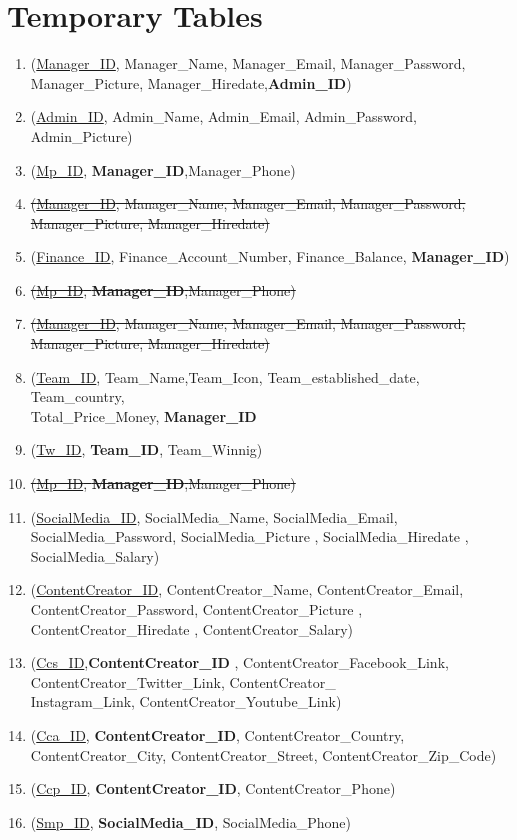 \section{Temporary Tables}
\hrulefill
\begin{enumerate}
    \item  (\underline{Manager\_ID}, Manager\_Name, Manager\_Email, Manager\_Password, Manager\_Picture, Manager\_Hiredate,\textbf{Admin\_ID})
    \item  (\underline{Admin\_ID}, Admin\_Name, Admin\_Email, Admin\_Password, Admin\_Picture)
    \item (\underline{Mp\_ID}, \textbf{Manager\_ID},{Manager\_Phone})


    \item \sout{(\underline{Manager\_ID}, Manager\_Name, Manager\_Email, Manager\_Password, Manager\_Picture, Manager\_Hiredate)}
    \item (\underline{Finance\_ID}, Finance\_Account\_Number, Finance\_Balance,\textbf{ Manager\_ID})
    \item \sout{(\underline{Mp\_ID}, \textbf{Manager\_ID},{Manager\_Phone})}


    \item \sout{(\underline{Manager\_ID}, Manager\_Name, Manager\_Email, Manager\_Password,\\Manager\_Picture, Manager\_Hiredate)}
    \item (\underline{Team\_ID}, Team\_Name,Team\_Icon, Team\_established\_date, Team\_country,\\Total\_Price\_Money, \textbf{Manager\_ID}
    \item (\underline{Tw\_ID}, \textbf{Team\_ID}, Team\_Winnig)
    \item \sout{(\underline{Mp\_ID}, \textbf{Manager\_ID},{Manager\_Phone})}



    \item  (\underline{SocialMedia\_ID}, SocialMedia\_Name, SocialMedia\_Email, SocialMedia\_Password, SocialMedia\_Picture , SocialMedia\_Hiredate , SocialMedia\_Salary)
    \item  (\underline{ContentCreator\_ID}, ContentCreator\_Name, ContentCreator\_Email, ContentCreator\_Password, ContentCreator\_Picture , ContentCreator\_Hiredate , ContentCreator\_Salary)
    \item (\underline{Ccs\_ID},\textbf{ContentCreator\_ID} , ContentCreator\_Facebook\_Link, ContentCreator\_Twitter\_Link, ContentCreator\_\\Instagram\_Link, ContentCreator\_Youtube\_Link)
    \item  (\underline{Cca\_ID}, \textbf{ContentCreator\_ID}, ContentCreator\_Country, ContentCreator\_City, ContentCreator\_Street, ContentCreator\_Zip\_Code)
    \item  (\underline{Ccp\_ID}, \textbf{ContentCreator\_ID}, ContentCreator\_Phone)
    \item  (\underline{Smp\_ID}, \textbf{SocialMedia\_ID}, SocialMedia\_Phone)


\end{enumerate}
